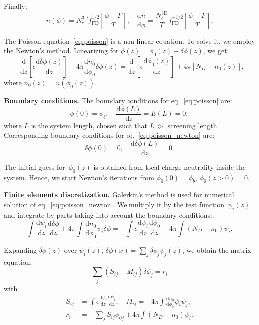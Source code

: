 \documentclass[10pt]{article}
\newcommand{\dd}{\mathrm{d}}
\newcommand{\fFD}{f_{\mathrm{FD}}}
\begin{document}
Finally:
\begin{equation}
	n(\phi) = N_c^\mathrm{3D} \fFD^{1/2} \left[ \frac{\phi + F}{T} \right], \quad
	\frac{\dd n}{\dd \phi} =
		\frac{N_c^\mathrm{3D}}{T} \fFD^{-1/2} \left[ \frac{\phi + F}{T} \right].
\end{equation}

The Poisson equation~\eqref{eq:poisson} is a non-linear equation. To solve it, we employ
the Newton's method. Linearizing for $\phi(z) = \phi_0(z) + \delta\phi(z)$, we get:
\begin{equation}
	\label{eq:poisson_newton}
	- \frac{\dd}{\dd z} \left[ \epsilon \frac{\dd \delta\phi(z)}{\dd z} \right]
	+ 4\pi \frac{\dd n_0}{\dd \phi_0} \delta\phi(z)
	= \frac{\dd}{\dd z} \left[ \epsilon \frac{\dd \phi_0(z)}{\dd z} \right]
	+ 4\pi [N_D - n_0(z)],
\end{equation}
where $n_0(z) = n(\phi_0(z))$.

\textbf{Boundary conditions.} The boundary conditions for eq.~\eqref{eq:poisson} are:
\begin{equation}
	\phi(0) = \phi_b, \quad \frac{\dd \phi(L)}{\dd z} = E(L) = 0,
\end{equation}
where $L$ is the system length, chosen such that $L \gg$ screening length. Corresponding
boundary conditions for eq.~\eqref{eq:poisson_newton} are:
\begin{equation}
	\delta\phi(0) = 0, \quad \frac{\dd \delta\phi(L)}{\dd z} = 0.
\end{equation}

The initial guess for~$\phi_0(z)$ is obtained from local charge neutrality inside the
system. Hence, we start Newton's iterations from $\phi_0(0) = \phi_b$, $\phi_0(z > 0) = 0$.

\textbf{Finite elements discretization.} Galerkin's method is used for numerical solution
of eq.~\eqref{eq:poisson_newton}. We multiply it by the test function~$\psi_i(z)$ and
integrate by parts taking into account the boundary conditions:
\begin{equation}
	\int \frac{\dd \psi_i}{\dd z} \frac{\dd \delta\phi}{\dd z}
	+ 4\pi \int \frac{\dd n_0}{\dd \phi_0} \psi_i \delta\phi
	= - \int \epsilon \frac{\dd \psi_i}{\dd z} \frac{\dd \phi_0}{\dd z}
	+ 4\pi \int (N_D - n_0) \psi_i.
\end{equation}

Expanding $\delta\phi(z)$ over $\psi_i(z)$, $\delta\phi(x) = \sum_j \delta\phi_j \psi_j(z)$,
we obtain the matrix equation:
\begin{equation}
	\sum_j \left( S_{ij} - M_{ij} \right) \delta\phi_j = r_i
\end{equation}
with
\begin{equation}
\begin{split}
	S_{ij} &= \int \epsilon \frac{\dd \psi_i}{\dd z} \frac{\dd \psi_j}{\dd z}, \quad
	M_{ij} = -4\pi \int \frac{\dd n_0}{\dd \phi_0} \psi_i \psi_j, \\
	r_i &= - \sum_j S_{ij} \phi_{0j} + 4\pi \int (N_D - n_0) \psi_i.
\end{split}
\end{equation}
\end{document}
